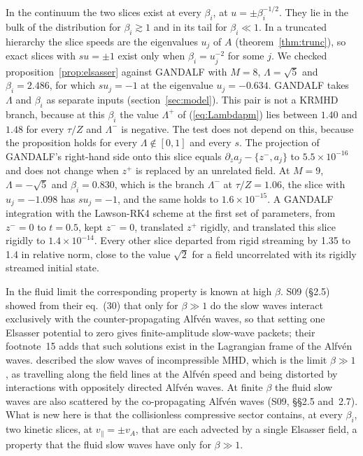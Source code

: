 In the continuum the two slices exist at every $\beta_i$, at $u=\pm\beta_i^{-1/2}$. They lie in the bulk of the distribution for $\beta_i\gtrsim1$ and in its tail for $\beta_i\ll1$. In a truncated hierarchy the slice speeds are the eigenvalues $u_j$ of $A$ (theorem~\ref{thm:trunc}), so exact slices with $su=\pm1$ exist only when $\beta_i=u_j^{-2}$ for some $j$. We checked proposition~\ref{prop:elsasser} against GANDALF with $M=8$, $\Lambda=\sqrt5$ and $\beta_i=2.486$, for which $su_j=-1$ at the eigenvalue $u_j=-0.634$. GANDALF takes $\Lambda$ and $\beta_i$ as separate inputs (section~\ref{sec:model}). This pair is not a KRMHD branch, because at this $\beta_i$ the value $\Lambda^+$ of (\ref{eq:Lambdapm}) lies between $1.40$ and $1.48$ for every $\tau/Z$ and $\Lambda^-$ is negative. The test does not depend on this, because the proposition holds for every $\Lambda\notin[0,1]$ and every $s$. The projection of GANDALF's right-hand side onto this slice equals $\partial_za_j-\{z^-,a_j\}$ to $5.5\times10^{-16}$ and does not change when $z^+$ is replaced by an unrelated field. At $M=9$, $\Lambda=-\sqrt5$ and $\beta_i=0.830$, which is the branch $\Lambda^-$ at $\tau/Z=1.06$, the slice with $u_j=-1.098$ has $su_j=-1$, and the same holds to $1.6\times10^{-15}$. A GANDALF integration with the Lawson-RK4 scheme at the first set of parameters, from $z^-=0$ to $t=0.5$, kept $z^-=0$, translated $z^+$ rigidly, and translated this slice rigidly to $1.4\times10^{-14}$. Every other slice departed from rigid streaming by 1.35 to 1.4 in relative norm, close to the value $\sqrt2$ for a field uncorrelated with its rigidly streamed initial state.

In the fluid limit the corresponding property is known at high $\beta$. S09 (\S2.5) showed from their eq.~(30) that only for $\beta\gg1$ do the slow waves interact exclusively with the counter-propagating Alfv\'en waves, so that setting one Elsasser potential to zero gives finite-amplitude slow-wave packets; their footnote~15 adds that such solutions exist in the Lagrangian frame of the Alfv\'en waves. \citet[\S2.4]{LithwickGoldreich2001} described the slow waves of incompressible MHD, which is the limit $\beta\gg1$, as travelling along the field lines at the Alfv\'en speed and being distorted by interactions with oppositely directed Alfv\'en waves. At finite $\beta$ the fluid slow waves are also scattered by the co-propagating Alfv\'en waves (S09, \S\S2.5 and~2.7). What is new here is that the collisionless compressive sector contains, at every $\beta_i$, two kinetic slices, at $v_\parallel=\pm v_A$, that are each advected by a single Elsasser field, a property that the fluid slow waves have only for $\beta\gg1$.

